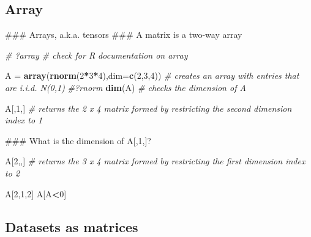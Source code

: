 \documentclass[12pt,]{book}
\newenvironment{Shaded}{\begin{snugshade}}{\end{snugshade}}
\newcommand{\KeywordTok}[1]{\textcolor[rgb]{0.13,0.29,0.53}{\textbf{#1}}}
\newcommand{\DataTypeTok}[1]{\textcolor[rgb]{0.13,0.29,0.53}{#1}}
\newcommand{\DecValTok}[1]{\textcolor[rgb]{0.00,0.00,0.81}{#1}}
\newcommand{\StringTok}[1]{\textcolor[rgb]{0.31,0.60,0.02}{#1}}
\newcommand{\CommentTok}[1]{\textcolor[rgb]{0.56,0.35,0.01}{\textit{#1}}}
\newcommand{\OperatorTok}[1]{\textcolor[rgb]{0.81,0.36,0.00}{\textbf{#1}}}
\newcommand{\NormalTok}[1]{#1}
\begin{document}
\subsection{Array}\label{array}

\begin{Shaded}
\begin{Highlighting}[]
\NormalTok{### Arrays, a.k.a. tensors}
\NormalTok{### A matrix is a two-way array}

\CommentTok{# ?array # check for R documentation on array}

\NormalTok{A =}\StringTok{ }\KeywordTok{array}\NormalTok{(}\KeywordTok{rnorm}\NormalTok{(}\DecValTok{2}\OperatorTok{*}\DecValTok{3}\OperatorTok{*}\DecValTok{4}\NormalTok{),}\DataTypeTok{dim=}\KeywordTok{c}\NormalTok{(}\DecValTok{2}\NormalTok{,}\DecValTok{3}\NormalTok{,}\DecValTok{4}\NormalTok{))  }\CommentTok{# creates an array with entries that are i.i.d. N(0,1)}
\CommentTok{#?rnorm}
\KeywordTok{dim}\NormalTok{(A) }\CommentTok{# checks the dimension of A}

\NormalTok{A[,}\DecValTok{1}\NormalTok{,] }\CommentTok{# returns the 2 x 4 matrix formed by restricting the second dimension index to 1}

\NormalTok{### What is the dimension of A[,1,]?}

\NormalTok{A[}\DecValTok{2}\NormalTok{,,] }\CommentTok{# returns the 3 x 4 matrix formed by restricting the first dimension index to 2}

\NormalTok{A[}\DecValTok{2}\NormalTok{,}\DecValTok{1}\NormalTok{,}\DecValTok{2}\NormalTok{]}
\NormalTok{A[A}\OperatorTok{<}\DecValTok{0}\NormalTok{]}
\end{Highlighting}
\end{Shaded}

\subsection{Datasets as matrices}\label{datasets-as-matrices}
\end{document}
